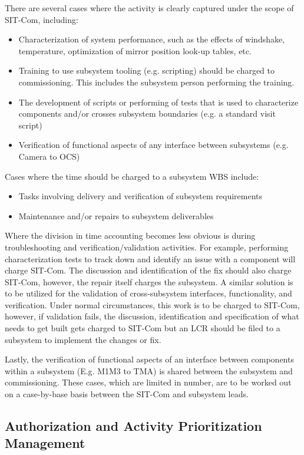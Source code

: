 \documentclass[SE,lsstdraft,authoryear,toc]{lsstdoc, lsstdraft}
\begin{document}
There are several cases where the activity is clearly captured under the scope of SIT-Com, including:
\begin{itemize}
    \item Characterization of system performance, such as the effects of windshake, temperature, optimization of mirror position look-up tables, etc.
    \item Training to use subsystem tooling (e.g. scripting) should be charged to commissioning.
    This includes the subsystem person performing the training.
    \item The development of scripts or performing of tests that is used to characterize components and/or crosses subsystem boundaries (e.g. a standard visit script)
    \item Verification of functional aspects of any interface between subsystems (e.g. Camera to OCS)
\end{itemize}

Cases where the time should be charged to a subsystem WBS include:
\begin{itemize}
    \item Tasks involving delivery and verification of subsystem requirements
    \item Maintenance and/or repairs to subsystem deliverables
\end{itemize}

Where the division in time accounting becomes less obvious is during troubleshooting and verification/validation activities.
For example, performing characterization tests to track down and identify an issue with a component will charge SIT-Com.
The discussion and identification of the fix should also charge SIT-Com, however, the repair itself charges the subsystem.
A similar solution is to be utilized for the validation of cross-subsystem interfaces, functionality, and verification.
Under normal circumstances, this work is to be charged to SIT-Com, however, if validation fails, the discussion, identification and specification of what needs to get built gets charged to SIT-Com but an LCR should be filed to a subsystem to implement the changes or fix.

Lastly, the verification of functional aspects of an interface between components within a subsystem (E.g. M1M3 to TMA) is shared between the subsystem and commissioning.
These cases, which are limited in number, are to be worked out on a case-by-base basis between the SIT-Com and subsystem leads.

\subsection{Authorization and Activity Prioritization Management}
\end{document}
